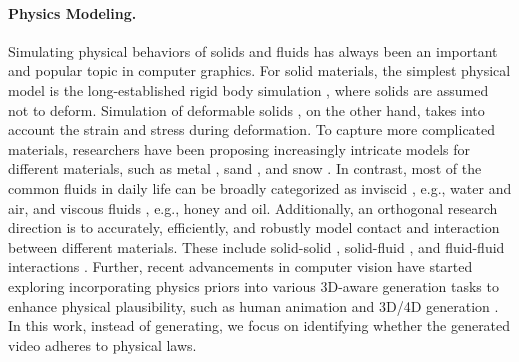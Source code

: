 \paragraph{Physics Modeling.}
Simulating physical behaviors of solids and fluids has always been an important and popular topic in computer graphics. For solid materials, the simplest physical model is the long-established rigid body simulation \cite{baraff1997introduction}, where solids are assumed not to deform. Simulation of deformable solids \cite{sifakis2012fem}, on the other hand, takes into account the strain and stress during deformation. To capture more complicated materials, researchers have been proposing increasingly intricate models for different materials, such as metal \cite{o2002graphical}, sand \cite{klar2016drucker}, and snow \cite{stomakhin2013material}. In contrast, most of the common fluids \cite{bridson2015fluid} in daily life can be broadly categorized as inviscid \cite{koschier2020smoothed}, e.g., water and air, and viscous fluids \cite{takahashi2014fast, larionov2017variational}, e.g., honey and oil. Additionally, an orthogonal research direction is to accurately, efficiently, and robustly model contact and interaction between different materials. These include solid-solid \cite{li2020incremental, li2020codimensional}, solid-fluid \cite{batty2007fast, xie2023contact}, and fluid-fluid interactions \cite{muller2005particle}. Further, recent advancements in computer vision have started exploring incorporating physics priors into various 3D-aware generation tasks to enhance physical plausibility, such as human animation \cite{yuan2023physdiff, shimada2020physcap, xu2023interdiff} and 3D/4D generation \cite{mezghanni2021physically, xie2023physgaussian, zhang2024physdreamer}.  In this work, instead of generating, we focus on identifying whether the generated video adheres to physical laws.


